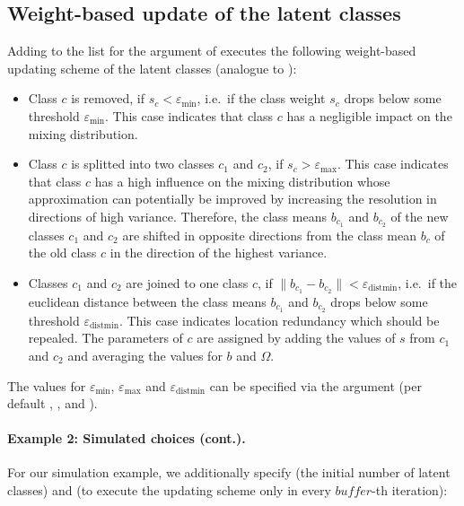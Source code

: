 \documentclass[article,shortnames]{jss}
\newcommand{\fct}[1]{\code{#1()}}
\begin{document}
\subsection{Weight-based update of the latent classes} \label{subsec:weight_update}

Adding  to the list for the  argument of \fct{fit\_model} executes the following weight-based updating scheme of the latent classes (analogue to \cite{Bauer:2019}):

\begin{itemize}
  \item Class $c$ is removed, if $s_c<\varepsilon_{\text{min}}$, i.e.\ if the class weight $s_c$ drops below some threshold $\varepsilon_{\text{min}}$. This case indicates that class $c$ has a negligible impact on the mixing distribution.
  \item Class $c$ is splitted into two classes $c_1$ and $c_2$, if $s_c>\varepsilon_\text{max}$. This case indicates that class $c$ has a high influence on the mixing distribution whose approximation can potentially be improved by increasing the resolution in directions of high variance. Therefore, the class means $b_{c_1}$ and $b_{c_2}$ of the new classes $c_1$ and $c_2$ are shifted in opposite directions from the class mean $b_c$ of the old class $c$ in the direction of the highest variance.
  \item Classes $c_1$ and $c_2$ are joined to one class $c$, if $\lVert b_{c_1} - b_{c_2} \rVert<\varepsilon_{\text{distmin}}$, i.e.\ if the euclidean distance between the class means $b_{c_1}$ and $b_{c_2}$  drops below some threshold $\varepsilon_{\text{distmin}}$. This case indicates location redundancy which should be repealed. The parameters of $c$ are assigned by adding the values of $s$ from $c_1$ and $c_2$ and averaging the values for $b$ and $\Omega$.
\end{itemize}

The values for $\varepsilon_{\text{min}}$, $\varepsilon_{\text{max}}$ and $\varepsilon_{\text{distmin}}$ can be specified via the  argument (per default , , and ).

\paragraph{Example 2: Simulated choices (cont.).}

For our simulation example, we additionally specify  (the initial number of latent classes) and  (to execute the updating scheme only in every $buffer$-th iteration):
\end{document}
